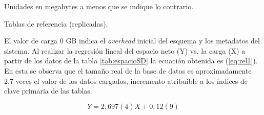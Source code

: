 \documentclass[12pt, letter paper]{report}
\begin{document}
\begin{table}[H]
\begin{threeparttable}
        \begin{tablenotes}
          \item[1] Unidades en megabytes a menos que se indique lo contrario.
          \item[2] Tablas de referencia (replicadas).
        \end{tablenotes}
        \label{tab:espacioSD}
        \end{threeparttable}
      \end{table}

      El valor de carga 0 GB indica el \textit{overhead} inicial del esquema y
      los metadatos del sistema. Al realizar la regresión lineal del espacio
      neto (Y) vs. la carga (X) a partir de los datos de la tabla
      \ref{tab:espacioSD} la ecuación obtenida es (\ref{eq:rel1}). En esta se
      observa que el tamaño real de la base de datos es aproximadamente 2.7
      veces el valor de los datos cargados, incremento atribuible a los índices
      de clave primaria de las tablas.

      \begin{equation}
        Y = 2,697(4) X + 0,12(9)
        \label{eq:rel1}
      \end{equation}
\end{document}

